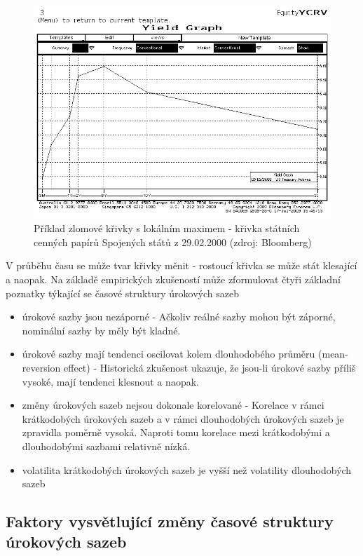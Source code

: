 \documentclass[a4paper]{book}
\begin{document}
\begin{figure}
  \includegraphics[bb=0 0 350 250]{curve_humped_max.bmp}
  \caption{Příklad zlomové křivky s lokálním maximem - křivka státních cenných papírů Spojených států z 29.02.2000 (zdroj: Bloomberg)}
  \label{curve_humped_max}
\end{figure}
V průběhu času se může tvar křivky měnit - rostoucí křivka se může stát klesající a naopak. Na základě empirických zkušeností může zformulovat čtyři základní poznatky týkající se časové struktury úrokových sazeb
\begin{itemize}
\item úrokové sazby jsou nezáporné - Ačkoliv reálné sazby mohou být záporné, nominální sazby by měly být kladné.
\item úrokové sazby mají tendenci oscilovat kolem dlouhodobého průměru (mean-reversion effect) - Historická zkušenost ukazuje, že jsou-li úrokové sazby příliš vysoké, mají tendenci klesnout a naopak.
\item změny úrokových sazeb nejsou dokonale korelované - Korelace v rámci krátkodobých úrokových sazeb a v rámci dlouhodobých úrokových sazeb je zpravidla poměrně vysoká. Naproti tomu korelace mezi krátkodobými a dlouhodobými sazbami relativně nízká.
\item volatilita krátkodobých úrokových sazeb je vyšší než volatility dlouhodobých sazeb
\end{itemize}

\subsection{Faktory vysvětlující změny časové struktury úrokových sazeb}
\end{document}
